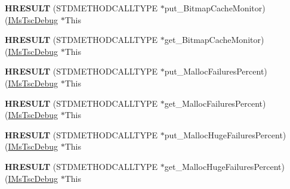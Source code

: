 \begin{DoxyCompactItemize}
\item 
\mbox{\label{struct_m_s_t_s_c_lib_1_1_i_ms_tsc_debug_vtbl_aa5042e94e8704ab1591335b362a7b5b7}} 
{\bfseries H\+R\+E\+S\+U\+LT} (S\+T\+D\+M\+E\+T\+H\+O\+D\+C\+A\+L\+L\+T\+Y\+PE $\ast$put\+\_\+\+Bitmap\+Cache\+Monitor)(\hyperlink{interface_m_s_t_s_c_lib_1_1_i_ms_tsc_debug}{I\+Ms\+Tsc\+Debug} $\ast$This
\item 
\mbox{\label{struct_m_s_t_s_c_lib_1_1_i_ms_tsc_debug_vtbl_ada56a2c2ee780a118ee3802efbefe98e}} 
{\bfseries H\+R\+E\+S\+U\+LT} (S\+T\+D\+M\+E\+T\+H\+O\+D\+C\+A\+L\+L\+T\+Y\+PE $\ast$get\+\_\+\+Bitmap\+Cache\+Monitor)(\hyperlink{interface_m_s_t_s_c_lib_1_1_i_ms_tsc_debug}{I\+Ms\+Tsc\+Debug} $\ast$This
\item 
\mbox{\label{struct_m_s_t_s_c_lib_1_1_i_ms_tsc_debug_vtbl_a537eb0a1460697bd4090d54d80c463b0}} 
{\bfseries H\+R\+E\+S\+U\+LT} (S\+T\+D\+M\+E\+T\+H\+O\+D\+C\+A\+L\+L\+T\+Y\+PE $\ast$put\+\_\+\+Malloc\+Failures\+Percent)(\hyperlink{interface_m_s_t_s_c_lib_1_1_i_ms_tsc_debug}{I\+Ms\+Tsc\+Debug} $\ast$This
\item 
\mbox{\label{struct_m_s_t_s_c_lib_1_1_i_ms_tsc_debug_vtbl_a6aab88ce6613c326314d5c0c8807e831}} 
{\bfseries H\+R\+E\+S\+U\+LT} (S\+T\+D\+M\+E\+T\+H\+O\+D\+C\+A\+L\+L\+T\+Y\+PE $\ast$get\+\_\+\+Malloc\+Failures\+Percent)(\hyperlink{interface_m_s_t_s_c_lib_1_1_i_ms_tsc_debug}{I\+Ms\+Tsc\+Debug} $\ast$This
\item 
\mbox{\label{struct_m_s_t_s_c_lib_1_1_i_ms_tsc_debug_vtbl_a65ee850b04f2c89682f348c1afde8705}} 
{\bfseries H\+R\+E\+S\+U\+LT} (S\+T\+D\+M\+E\+T\+H\+O\+D\+C\+A\+L\+L\+T\+Y\+PE $\ast$put\+\_\+\+Malloc\+Huge\+Failures\+Percent)(\hyperlink{interface_m_s_t_s_c_lib_1_1_i_ms_tsc_debug}{I\+Ms\+Tsc\+Debug} $\ast$This
\item 
\mbox{\label{struct_m_s_t_s_c_lib_1_1_i_ms_tsc_debug_vtbl_a6c85fbc92d871ce2e41c032ebc09f6d5}} 
{\bfseries H\+R\+E\+S\+U\+LT} (S\+T\+D\+M\+E\+T\+H\+O\+D\+C\+A\+L\+L\+T\+Y\+PE $\ast$get\+\_\+\+Malloc\+Huge\+Failures\+Percent)(\hyperlink{interface_m_s_t_s_c_lib_1_1_i_ms_tsc_debug}{I\+Ms\+Tsc\+Debug} $\ast$This

\end{DoxyCompactItemize}

